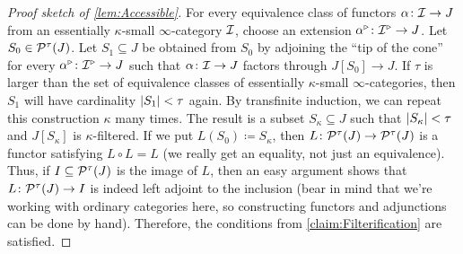 \begin{proof}[Proof sketch of \cref{lem:Accessible}]
	For every equivalence class of functors $\alpha\colon \mathcal{I}\rightarrow J$ from an essentially $\kappa$-small $\infty$-category $\mathcal{I}$, choose an extension $\alpha^\triangleright\colon \mathcal{I}^\triangleright\rightarrow J$. Let $S_0\in \mathcal{P}^\tau(J)$. Let $S_1\subseteq J$ be obtained from $S_0$ by adjoining the \enquote{tip of the cone} for every $\alpha^\triangleright \colon \mathcal{I}^\triangleright\rightarrow J$ such that $\alpha\colon \mathcal{I} \rightarrow J$ factors through $J[S_0]\rightarrow J$. If $\tau$ is larger than the set of equivalence classes of essentially $\kappa$-small $\infty$-categories, then $S_1$ will have cardinality $\abs*{S_1}<\tau$ again. By transfinite induction, we can repeat this construction $\kappa$ many times. The result is a subset $S_\kappa\subseteq J$ such that $\abs*{S_\kappa}<\tau$ and $J[S_\kappa]$ is $\kappa$-filtered. If we put $L(S_0)\coloneqq S_\kappa$, then $L\colon \mathcal{P}^\tau(J)\rightarrow \mathcal{P}^\tau(J)$ is a functor satisfying $L\circ L=L$ (we really get an equality, not just an equivalence). Thus, if $I\subseteq \mathcal{P}^\tau(J)$ is the image of $L$, then an easy argument shows that $L\colon \mathcal{P}^\tau(J)\rightarrow I$ is indeed left adjoint to the inclusion (bear in mind that we're working with ordinary categories here, so constructing functors and adjunctions can be done by hand). Therefore, the conditions from \cref{claim:Filterification} are satisfied.
\end{proof}
